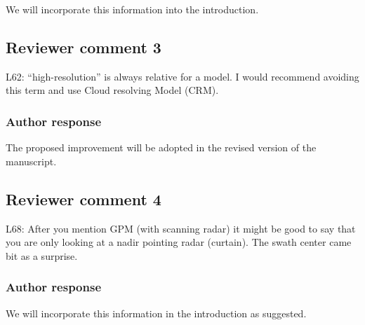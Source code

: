 \documentclass[11pt]{scrartcl}
\begin{document}
We will incorporate this information into the introduction.

%

\subsection*{Reviewer comment 3}

L62: “high-resolution” is always relative for a model. I would recommend avoiding this term and use Cloud resolving Model (CRM).

\subsubsection*{Author response}

The proposed improvement will be adopted in the revised version of the manuscript.



\textit{}

\subsection*{Reviewer comment 4}

L68:  After you mention GPM (with scanning radar) it might be good to say that you are only looking at a nadir pointing radar (curtain).  The swath center came bit as a surprise.

\subsubsection*{Author response}

We will incorporate this information in the introduction as suggested.

%
\end{document}
